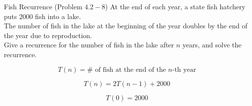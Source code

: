 
\begin{frame}{}
  \centerline{}

\end{frame}

\begin{frame}{}
  \begin{exampleblock}{Fish Recurrence (Problem $4.2-8$)}
    At the end of each year, a state fish hatchery puts $2000$ fish into a lake. \\[6pt]

    The number of fish in the lake at the beginning of the year doubles by the end of the year 
    due to reproduction. \\[6pt]
    
    Give a recurrence for the number of fish in the lake after $n$ years, and solve the recurrence.
  \end{exampleblock}

  \pause
  \[
    T(n) = \# \text{ of fish at the end of the } n\text{-th year}
  \]

  \pause
  \[
    T(n) = 2T(n-1) + 2000
  \]

  \pause
  \[
    T(0) = 2000
  \]
\end{frame}
